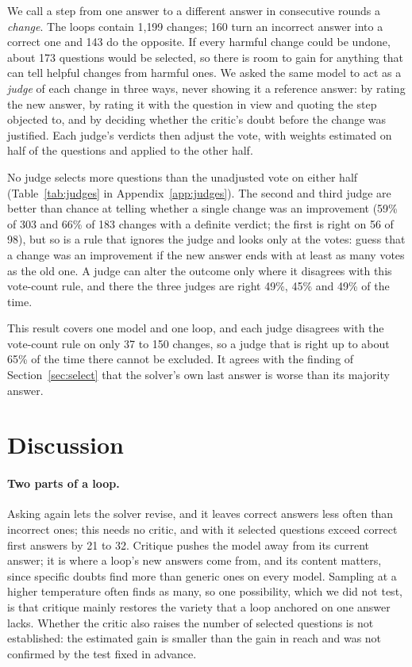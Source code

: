 \documentclass[11pt]{article}
\begin{document}
We call a step from one answer to a different answer in consecutive rounds a \emph{change}.
The loops contain 1{,}199 changes; 160 turn an incorrect answer into a correct one and 143 do the opposite.
If every harmful change could be undone, about 173 questions would be selected, so there is room to gain for anything that can tell helpful changes from harmful ones.
We asked the same model to act as a \emph{judge} of each change in three ways, never showing it a reference answer: by rating the new answer, by rating it with the question in view and quoting the step objected to, and by deciding whether the critic's doubt before the change was justified.
Each judge's verdicts then adjust the vote, with weights estimated on half of the questions and applied to the other half.

No judge selects more questions than the unadjusted vote on either half (Table~\ref{tab:judges} in Appendix~\ref{app:judges}).
The second and third judge are better than chance at telling whether a single change was an improvement (59\% of 303 and 66\% of 183 changes with a definite verdict; the first is right on 56 of 98), but so is a rule that ignores the judge and looks only at the votes: guess that a change was an improvement if the new answer ends with at least as many votes as the old one.
A judge can alter the outcome only where it disagrees with this vote-count rule, and there the three judges are right 49\%, 45\% and 49\% of the time.

This result covers one model and one loop, and each judge disagrees with the vote-count rule on only 37 to 150 changes, so a judge that is right up to about 65\% of the time there cannot be excluded.
It agrees with the finding of Section~\ref{sec:select} that the solver's own last answer is worse than its majority answer.

\section{Discussion}

\paragraph{Two parts of a loop.}
Asking again lets the solver revise, and it leaves correct answers less often than incorrect ones; this needs no critic, and with it selected questions exceed correct first answers by 21 to 32.
Critique pushes the model away from its current answer; it is where a loop's new answers come from, and its content matters, since specific doubts find more than generic ones on every model.
Sampling at a higher temperature often finds as many, so one possibility, which we did not test, is that critique mainly restores the variety that a loop anchored on one answer lacks.
Whether the critic also raises the number of selected questions is not established: the estimated gain is smaller than the gain in reach and was not confirmed by the test fixed in advance.
\end{document}
